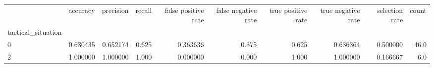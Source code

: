 \begin{tabular}{lrrrrrrrrr}
\toprule
{} &  accuracy &  precision &  recall &  false positive rate &  false negative rate &  true positive rate &  true negative rate &  selection rate &  count \\
tactical\_situation &           &            &         &                      &                      &                     &                     &                 &        \\
\midrule
0                  &  0.630435 &   0.652174 &   0.625 &             0.363636 &                0.375 &               0.625 &            0.636364 &        0.500000 &   46.0 \\
2                  &  1.000000 &   1.000000 &   1.000 &             0.000000 &                0.000 &               1.000 &            1.000000 &        0.166667 &    6.0 \\
\bottomrule
\end{tabular}
